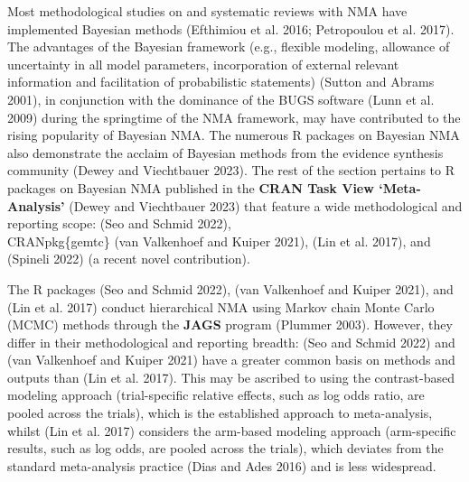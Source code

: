 Most methodological studies on and systematic reviews with NMA have implemented
Bayesian methods (Efthimiou et al. 2016; Petropoulou et al. 2017). The advantages of the Bayesian
framework (e.g., flexible modeling, allowance of uncertainty in all model parameters,
incorporation of external relevant information and facilitation of probabilistic
statements) (Sutton and Abrams 2001), in conjunction with the dominance of the BUGS software
(Lunn et al. 2009) during the springtime of the NMA framework, may have contributed to
the rising popularity of Bayesian NMA. The numerous R packages on Bayesian NMA
also demonstrate the acclaim of Bayesian methods from the evidence synthesis
community (Dewey and Viechtbauer 2023). The rest of the section pertains to R packages on
Bayesian NMA published in the \textbf{CRAN Task View `Meta-Analysis'} (Dewey and Viechtbauer 2023)
that feature a wide methodological and reporting scope:  (Seo and Schmid 2022),\\
CRANpkg\{gemtc\} (van Valkenhoef and Kuiper 2021),  (Lin et al. 2017), and 
(Spineli 2022) (a recent novel contribution).

The R packages  (Seo and Schmid 2022),  (van Valkenhoef and Kuiper 2021), and 
(Lin et al. 2017) conduct hierarchical NMA using Markov chain Monte Carlo (MCMC) methods
through the \textbf{JAGS} program (Plummer 2003). However, they differ in their
methodological and reporting breadth:  (Seo and Schmid 2022)
and  (van Valkenhoef and Kuiper 2021) have a greater common basis on methods and outputs
than  (Lin et al. 2017). This may be ascribed to using the contrast-based
modeling approach (trial-specific relative effects, such as log odds ratio, are
pooled across the trials), which is the established approach to meta-analysis, whilst
 (Lin et al. 2017) considers the arm-based modeling approach
(arm-specific results, such as log odds, are pooled across the trials), which
deviates from the standard meta-analysis practice (Dias and Ades 2016) and is less widespread.

